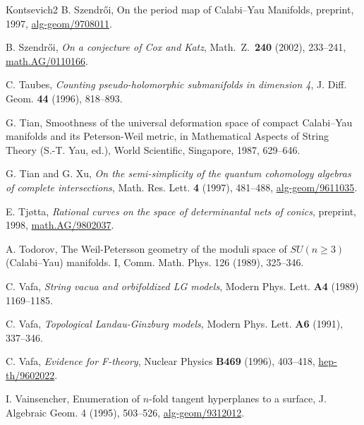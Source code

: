 \begin{thebibliography}{Kontsevich2}
\hypertarget{bib:Szendroi}{}
B. Szendrői, On the period map of Calabi--Yau Manifolds, preprint, 1997, \href{https://arxiv.org/abs/alg-geom/9708011}{alg-geom/9708011}.

\hypertarget{bib:Szendroi2}{} B. Szendr\H{o}i, \emph{On a conjecture of Cox and Katz}, Math.\ Z.\ \textbf{240} (2002), 233--241, \href{https://arxiv.org/abs/math.AG/0110166}{math.AG/0110166}.

\hypertarget{bib:Taubes}{} C. Taubes, \emph{Counting pseudo-holomorphic submanifolds in dimension 4}, J. Diff. Geom. \textbf{44} (1996), 818--893.

\hypertarget{bib:Tian}{}
G. Tian, Smoothness of the universal deformation space of compact Calabi--Yau manifolds
and its Peterson-Weil metric, in Mathematical Aspects of String Theory
(S.-T. Yau, ed.), World Scientific, Singapore, 1987, 629--646.


\hypertarget{bib:TX}{} G. Tian and G. Xu, \emph{On the semi-simplicity of the quantum cohomology algebras of complete intersections}, Math. Res. Lett. \textbf{4} (1997), 481--488, \href{https://arxiv.org/abs/alg-geom/9611035}{alg-geom/9611035}.

\hypertarget{bib:Tjotta}{}
E. Tjøtta, \emph{Rational curves on the space of determinantal nets of conics}, preprint, 1998, \href{https://arxiv.org/abs/math/9802037}{math.AG/9802037}.

\hypertarget{bib:Todorov}{}
A. Todorov, The Weil-Petersson geometry of the moduli space of $SU(n\geq3)$
(Calabi--Yau) manifolds. I, Comm. Math. Phys. 126 (1989), 325--346.

\hypertarget{bib:Vafa1}{} C. Vafa, \emph{String vacua and orbifoldized LG models}, Modern Phys. Lett. \textbf{A4} (1989) 1169--1185.

\hypertarget{bib:Vafa2}{} C. Vafa, \emph{Topological Landau-Ginzburg models}, Modern Phys. Lett. \textbf{A6} (1991), 337--346.

\hypertarget{bib:Vafa3}{} C. Vafa, \emph{Evidence for F-theory}, Nuclear Physics \textbf{B469} (1996), 403--418, \href{https://arxiv.org/abs/hep-th/9602022}{hep-th/9602022}.

\hypertarget{bib:Vainsencher}{}
I. Vainsencher,
Enumeration of \(n\)-fold tangent hyperplanes to a surface,
J. Algebraic Geom. 4 (1995), 503--526, \href{https://arxiv.org/abs/alg-geom/9312012}{alg-geom/9312012}.


\end{thebibliography}
